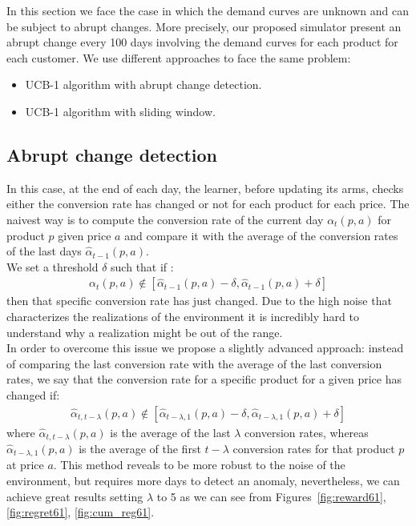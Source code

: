 In this section we face the case in which the demand curves are unknown and can be subject to abrupt changes. More precisely, our proposed simulator present an abrupt change every 100 days involving the demand curves for each product for each customer.
We use different approaches to face the same problem:
\begin{itemize}
    \item UCB-1 algorithm with abrupt change detection.
    \item UCB-1 algorithm with sliding window.
\end{itemize}
\subsection{Abrupt change detection}
\label{learner2}
In this case, at the end of each day, the learner, before updating its arms, checks either the conversion rate has changed or not for each product for each price. The naivest way is to compute the conversion rate of the current day $\alpha_t(p, a)$ for product $p$ given price $a$ and compare it with the average of the conversion rates of the last days $\hat{\alpha}_{t-1}(p, a)$.\\ We set a threshold $\delta$ such that if :
\begin{align*}
        \alpha_t(p, a) \not\in \left[ \hat{\alpha}_{t-1}(p, a) - \delta, \hat{\alpha}_{t-1}(p, a) + \delta \right]
\end{align*}
then that specific conversion rate has just changed. Due to the high noise that characterizes the realizations of the environment it is incredibly hard to understand why a realization might be out of the range.
\\In order to overcome this issue we propose a slightly advanced approach: instead of comparing the last conversion rate with the average of the last conversion rates, we say that the conversion rate for a specific product for a given price has changed if:
\begin{align*}
    \hat{\alpha}_{t, t -\lambda}(p, a) \not\in \left[ \hat{\alpha}_{t-\lambda, 1}(p, a) - \delta, \hat{\alpha}_{t-\lambda, 1}(p, a) + \delta \right]
\end{align*}
where $\hat{\alpha}_{t, t -\lambda}(p, a)$ is the average of the last $\lambda$ conversion rates, whereas $ \hat{\alpha}_{t-\lambda, 1}(p, a)$ is the average of the first $t - \lambda$ conversion rates for that product $p$ at price $a$. This method reveals to be more robust to the noise of the environment, but requires more days to detect an anomaly, nevertheless, we can achieve great results setting $\lambda$ to 5 as we can see from Figures~\ref{fig:reward61}, \ref{fig:regret61}, \ref{fig:cum_reg61}.\\
